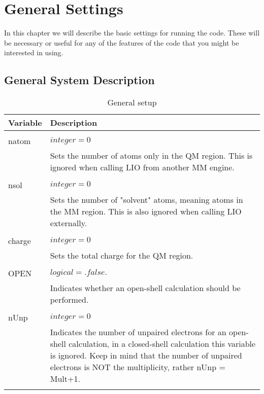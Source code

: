 \chapter{General Settings}

In this chapter we will describe the basic settings for running the code.
These will be necessary or useful for any of the features of the code
that you might be interested in using.

\section{General System Description}

\begin{Spacing}{1.0}
   \begin{longtable}{ p{} p{} }
   
      \toprule
      \textbf{Variable} & Description \\*
      \midrule \\*
      \endhead
   
      \bottomrule
      \caption{General setup}
      \endfoot

       natom  & $ integer = 0 $ \\
       & Sets the number of atoms only in the QM region. This is ignored when
       calling LIO from another MM engine.\\
       \\
       nsol   & $ integer = 0 $ \\
       & Sets the number of "solvent" atoms, meaning atoms in the MM region. 
       This is also ignored when calling LIO externally. \\
       \\
       charge & $ integer = 0 $ \\
       & Sets the total charge for the QM region. \\
       \\
       OPEN   & $ logical = .false. $\\
       & Indicates whether an open-shell calculation should be performed.\\
       \\
       nUnp   & $ integer = 0 $ \\
       & Indicates the number of unpaired electrons for an open-shell calculation, 
       in a closed-shell calculation this variable is ignored. Keep in mind that 
       the number of unpaired electrons is NOT the multiplicity, rather nUnp = Mult+1.\\
       \\

   \end{longtable}
\end{Spacing}


